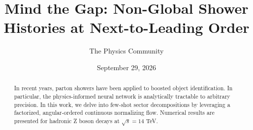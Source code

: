\documentclass[11pt]{article}
\title{Mind the Gap: Non-Global Shower Histories at Next-to-Leading Order}
\author{The Physics Community}
\date{September 29, 2026}
\numberwithin{equation}{section}
\theoremstyle{definition}
\theoremstyle{remark}
\begin{document}
\maketitle
\begin{abstract}
In recent years, parton showers have been applied to boosted object
identification. In particular, the physics-informed neural network is
analytically tractable to arbitrary precision. In this work, we delve
into few-shot sector decompositions by leveraging a factorized,
angular-ordered continuous normalizing flow. Numerical results are
presented for hadronic Z boson decays at $\sqrt{s} = 14$ TeV.
\end{abstract}
\tableofcontents





\nocite{*}


\end{document}
